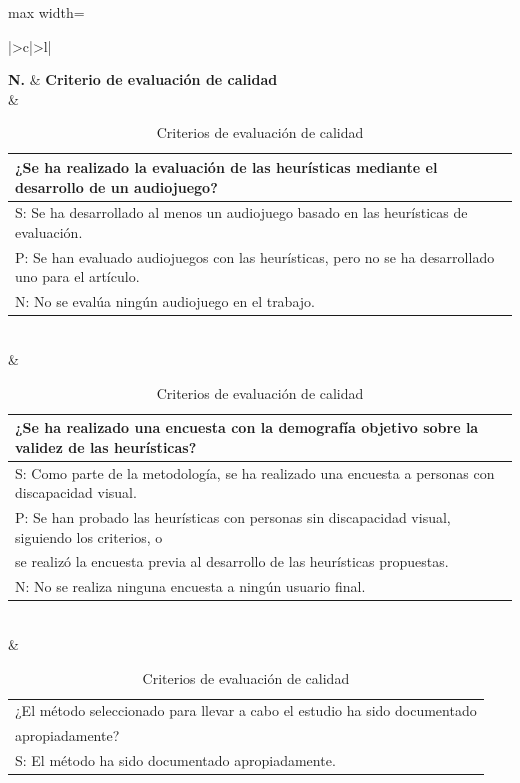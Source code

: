 \begin{center}
	
	\begin{table}[h]
		\centering
		\caption{Criterios de evaluación de calidad}
		\label{table:crit-heur-calid}
		\begin{adjustbox}{max width=\textwidth}
			\begin{NiceTabular}{ |>{\centering\arraybackslash}c|>{\centering\arraybackslash}l|  }
				
				\midrule
				\textbf{N.} & \textbf{Criterio de evaluación de calidad} \\
				 & \begin{tabular}{@{}l@{}}¿Se ha realizado la evaluación de las heurísticas mediante el desarrollo de un audiojuego? \\ 
					\midrule[0.5pt]
					S: Se ha desarrollado al menos un audiojuego basado en las heurísticas de evaluación. \\
					P: Se han evaluado audiojuegos con las heurísticas, pero no se ha desarrollado uno para el artículo. \\
					N: No se evalúa ningún audiojuego en el trabajo. \\\end{tabular} \\
				 & \begin{tabular}{@{}l@{}}¿Se ha realizado una encuesta con la demografía objetivo sobre la validez de las heurísticas? \\ 
					\midrule[0.5pt]
					S: Como parte de la metodología, se ha realizado una encuesta a personas con discapacidad visual. \\
					P: Se han probado las heurísticas con personas sin discapacidad visual, siguiendo los criterios, o \\ se realizó la encuesta previa al desarrollo de las heurísticas propuestas. \\
					N: No se realiza ninguna encuesta a ningún usuario final. \\\end{tabular} \\
				 & \begin{tabular}{@{}l@{}}
					¿El método seleccionado para llevar a cabo el estudio ha sido documentado \\apropiadamente? \cite[p ~23]{GuidelinesPerforming} \\ 
					\midrule[0.5pt]
					S: El método ha sido documentado apropiadamente. \\

\end{tabular}
\end{NiceTabular}
\end{adjustbox}
\end{table}
\end{center}
